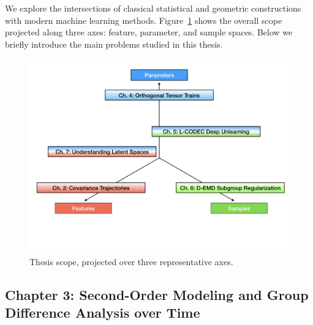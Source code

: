 We explore the intersections of classical statistical and geometric constructions with modern machine learning methods. 
Figure~\ref{fig:scope} shows the overall scope projected along three axes: feature, parameter, and sample spaces.
Below we briefly introduce the main problems studied in this thesis.
\begin{figure}[!ht]
    \centering
    \includegraphics[width=0.95\linewidth]{1_intro/thesis_scope_diss.png}
    \vspace{-50pt}
    \caption[Thesis Scope]{Thesis scope, projected over three representative axes.}
    \label{fig:scope}
\end{figure}

\subsection{Chapter 3: Second-Order Modeling and Group Difference Analysis over Time}

